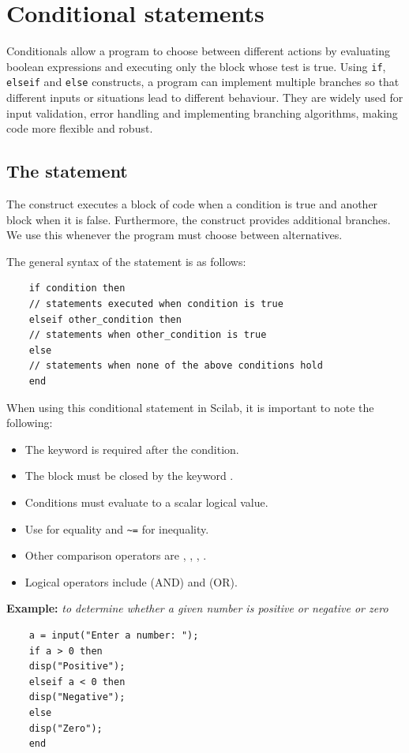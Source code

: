 \section{Conditional statements}
	Conditionals allow a program to choose between different actions by evaluating boolean expressions and executing only the block whose test is true. Using \texttt{if}, \texttt{elseif} and \texttt{else} constructs, a program can implement multiple branches so that different inputs or situations lead to different behaviour. They are widely used for input validation, error handling and implementing branching algorithms, making code more flexible and robust.
	
	\subsection{The  statement}
		The  construct executes a block of code when a condition is true and another block when it is false. Furthermore, the  construct provides additional branches. We use this whenever the program must choose between alternatives.
		
		The general syntax of the  statement is as follows:
	\begin{verbatim}
	if condition then
	// statements executed when condition is true
	elseif other_condition then
	// statements when other_condition is true
	else
	// statements when none of the above conditions hold
	end
		\end{verbatim}
	
		When using this conditional statement in Scilab, it is important to note the following:
		\begin{itemize}
			\item The keyword  is required after the condition.
			\item The  block must be closed by the keyword .
			\item Conditions must evaluate to a scalar logical value.
			\item Use \code{==} for equality and \verb|~=| for inequality.
			\item Other comparison operators are \code{>}, \code{<}, \code{>=}, \code{<=}.
			\item Logical operators include \code{\&} (AND) and \code{|} (OR).
		\end{itemize}
		
		\textbf{Example:} \textit{to determine whether a given number is positive or negative or zero}
		\begin{verbatim}
	a = input("Enter a number: ");
	if a > 0 then
	disp("Positive");
	elseif a < 0 then
	disp("Negative");
	else
	disp("Zero");
	end
		\end{verbatim}